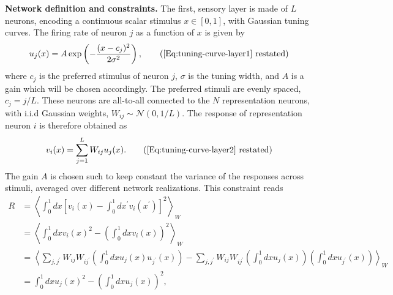 \documentclass[a4paper]{article}%
\begin{document}
\textbf{Network definition and constraints.} The first, sensory layer is made
of $L$ neurons, encoding a continuous scalar stimulus $x \in[0,1]$, with
Gaussian tuning curves.
The firing rate of neuron $j$ as a function of $x$ is given by
\begin{equation}
u_{j}(x) = A\exp\left(  -\frac{(x-c_{j})^{2}}{2\sigma^{2}}\right)  ,
\tag{\ref{Eq:tuning-curve-layer1} restated}%
\end{equation}
where $c_{j}$ is the preferred stimulus of neuron $j$, $\sigma$ is the tuning
width, and $A$ is a gain which will be chosen accordingly. The preferred
stimuli are evenly spaced, $c_{j}= j/L$. These neurons are all-to-all
connected to the $N$ representation neurons, with i.i.d Gaussian weights,
$W_{ij} \sim\mathcal{N}(0,1/L)$. The response of representation neuron $i$ is
therefore obtained as
\begin{equation}
v_{i}(x) = \sum_{j=1}^{L} W_{ij}u_{j}(x). \tag{\ref{Eq:tuning-curve-layer2}
restated}%
\end{equation}
The gain $A$ is chosen such to keep constant the variance of the responses across stimuli, averaged over different network realizations. This constraint reads
\begin{equation}
\begin{split}
R  &  = \left\langle \int_{0}^{1} dx \left[  v_{i}\left(  x\right)  -\int%
_{0}^{1}dx^{\prime} v_{i}\left(  x^{\prime}\right)  \right]  ^{2}
\right\rangle _{W}\\
&  = \left\langle \int_{0}^{1} dx v_{i}(x)^{2} - \left(  \int_{0}^{1} dx
v_{i}(x)\right)  ^{2} \right\rangle _{W}\\
&  = \left\langle \sum_{j,j^{\prime}} W_{ij}W_{ij^{\prime}}\left(  \int%
_{0}^{1} dx u_{j}(x)u_{j^{\prime}}(x)\right)  - \sum_{j,j^{\prime}}
W_{ij}W_{ij^{\prime}}\left(  \int_{0}^{1} dx u_{j}(x)\right)  \left(  \int%
_{0}^{1} dx u_{j^{\prime}}(x)\right)  \right\rangle _{W}\\
&  = \int_{0}^{1} dx u_{j}\left(  x\right)  ^{2} - \left(  \int_{0}^{1} dx
u_{j}\left(  x\right)  \right)  ^{2} ,\label{Eq:resource-constraint-ext}%
\end{split}
\end{equation}
\end{document}
